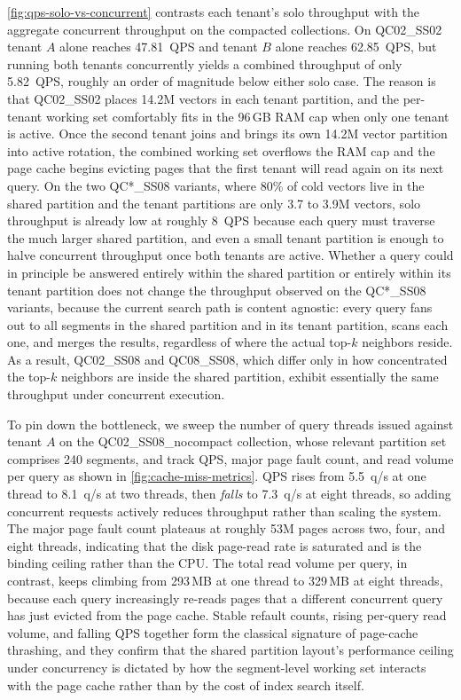  \autoref{fig:qps-solo-vs-concurrent} contrasts each
tenant's solo throughput with the aggregate concurrent throughput on
the compacted collections. On QC02\_SS02 tenant $A$ alone reaches
47.81~QPS and tenant $B$ alone reaches 62.85~QPS, but running both
tenants concurrently yields a combined throughput of only 5.82~QPS,
roughly an order of magnitude below either solo case. The reason is
that QC02\_SS02 places 14.2M vectors in each tenant partition, and the
per-tenant working set comfortably fits in the 96\,GB RAM cap when
only one tenant is active. Once the second tenant joins and brings
its own 14.2M vector partition into active rotation, the combined
working set overflows the RAM cap and the page cache begins evicting
pages that the first tenant will read again on its next query. On
the two QC*\_SS08 variants, where 80\% of cold vectors live in the
shared partition and the tenant partitions are only 3.7 to 3.9M
vectors, solo throughput is already low at roughly 8~QPS because each
query must traverse the much larger shared partition, and even a
small tenant partition is enough to halve concurrent throughput once
both tenants are active. Whether a query could in principle be
answered entirely within the shared partition or entirely within
its tenant partition does not change the throughput observed on the
QC*\_SS08 variants, because the current search path is content
agnostic: every query fans out to all segments in the shared
partition and in its tenant partition, scans each one, and merges
the results, regardless of where the actual top-$k$ neighbors
reside. As a result, QC02\_SS08 and QC08\_SS08, which differ only
in how concentrated the top-$k$ neighbors are inside the shared
partition, exhibit essentially the same throughput under
concurrent execution.

 To
pin down the bottleneck, we sweep the number of query threads issued
against tenant $A$ on the QC02\_SS08\_nocompact collection, whose
relevant partition set comprises 240 segments, and track QPS, major
page fault count, and read volume per query as shown in
\autoref{fig:cache-miss-metrics}. QPS rises from 5.5~q/s at one
thread to 8.1~q/s at two threads, then \emph{falls} to 7.3~q/s at
eight threads, so adding concurrent requests actively reduces
throughput rather than scaling the system. The major page
fault count plateaus at roughly 53M pages across two, four, and
eight threads, indicating that the disk page-read rate is saturated
and is the binding ceiling rather than the CPU. The total read
volume per query, in contrast, keeps climbing from 293\,MB at one
thread to 329\,MB at eight threads, because each query increasingly
re-reads pages that a different concurrent query has just evicted
from the page cache. Stable refault counts, rising per-query read
volume, and falling QPS together form the classical signature of
page-cache thrashing, and they confirm that the shared partition
layout's performance ceiling under concurrency is dictated by how
the segment-level working set interacts with the page cache rather
than by the cost of index search itself.
